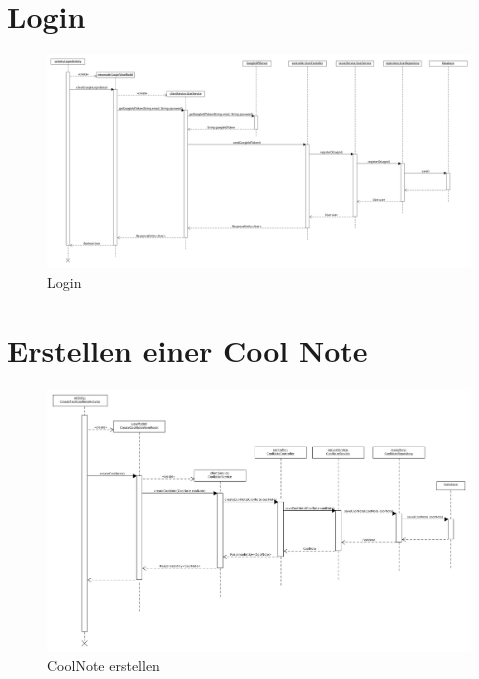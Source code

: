 \documentclass[a4paper]{scrreprt}
\begin{document}
	\newpage
		\section{Login}
		 \begin{figure}[H]
	       \centering
	       \includegraphics[scale = .20]{login_sequenzdiagramm.png}
	       \caption{Login}
	      \end{figure}
	      
	      	
	 
	 \newpage
		\section{Erstellen einer Cool Note}
		 \begin{figure}[H]
	       \centering
	       \includegraphics[scale = .30]{SD_CoolNote_erstellen.png}
	       \caption{CoolNote erstellen}
	      \end{figure}
	      
	      
	      	
		
	     \newpage 
\end{document}

